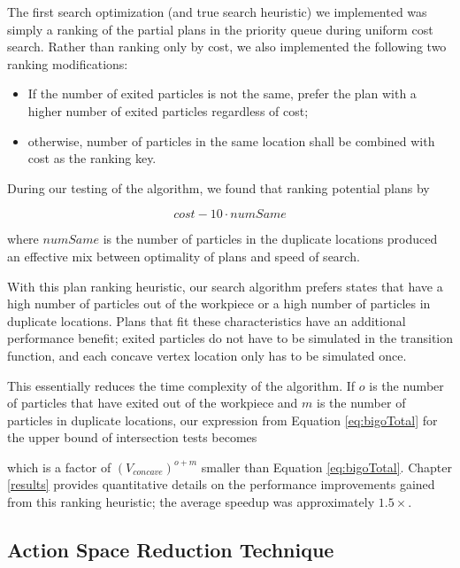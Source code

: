 The first search optimization (and true search heuristic) we implemented was simply a ranking of the partial plans in the priority queue during uniform cost search. Rather than ranking only by cost, we also implemented the following two ranking modifications:

\begin{itemize}
\item If the number of exited particles is not the same, prefer the plan with a higher number of exited particles regardless of cost;
\item otherwise, number of particles in the same location shall be combined with cost as the ranking key.
\end{itemize}

During our testing of the algorithm, we found that ranking potential plans by

$$
cost - 10 \cdot numSame
$$

where $numSame$ is the number of particles in the duplicate locations produced an effective mix between optimality of plans and speed of search.

With this plan ranking heuristic, our search algorithm prefers states that have a high number of particles out of the workpiece or a high number of particles in duplicate locations. Plans that fit these characteristics have an additional performance benefit; exited particles do not have to be simulated in the transition function, and each concave vertex location only has to be simulated once.

This essentially reduces the time complexity of the algorithm. If $o$ is the number of particles that have exited out of the workpiece and $m$ is the number of particles in duplicate locations, our expression from Equation \eqref{eq:bigoTotal} for the upper bound of intersection tests becomes

 {
  \label{eq:bigoTotalWithHeuristic}
}

which is a factor of $(V_{concave})^{o + m}$ smaller than Equation \eqref{eq:bigoTotal}. Chapter \ref{results} provides quantitative details on the performance improvements gained from this ranking heuristic; the average speedup was approximately $1.5 \times$.

\subsection{Action Space Reduction Technique}

